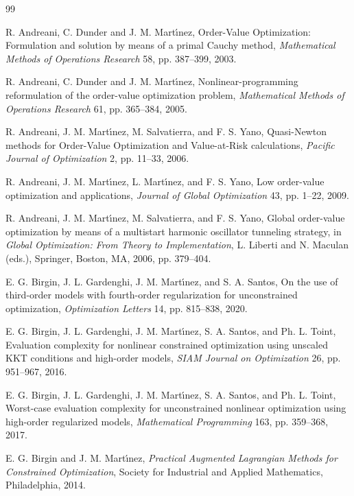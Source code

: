 \documentclass[11pt]{article}
\begin{document}
\begin{thebibliography}{99}

 R. Andreani, C. Dunder and J. M. Mart\'{\i}nez, Order-Value Optimization: Formulation and solution by means of a primal Cauchy method, \textit{Mathematical Methods of Operations Research} 58, pp. 387--399, 2003.

 R. Andreani, C. Dunder and J. M. Mart\'{\i}nez, Nonlinear-programming reformulation of the order-value optimization problem, \textit{Mathematical Methods of Operations Research} 61, pp. 365--384, 2005.

 R. Andreani, J. M. Mart\'{\i}nez, M. Salvatierra, and F. S. Yano, Quasi-Newton methods for Order-Value Optimization and Value-at-Risk calculations, \textit{Pacific Journal of Optimization} 2, pp. 11--33, 2006.

 R. Andreani, J. M. Mart\'{\i}nez, L. Mart\'{\i}nez, and F. S. Yano, Low order-value optimization and applications, \textit{Journal of Global Optimization} 43, pp. 1--22, 2009.

 R. Andreani, J. M. Mart\'{\i}nez, M. Salvatierra, and F. S. Yano, Global order-value optimization by means of a multistart harmonic oscillator tunneling strategy, in \textit{Global Optimization: From Theory to Implementation}, L. Liberti and N. Maculan (eds.), Springer, Boston, MA, 2006, pp. 379--404.

 E. G. Birgin, J. L. Gardenghi, J. M. Mart\'{\i}nez, and S. A. Santos, On the use of third-order models with fourth-order regularization for unconstrained optimization, \textit{Optimization Letters} 14, pp. 815--838, 2020.

 E. G. Birgin, J. L. Gardenghi, J. M. Mart\'{\i}nez, S. A. Santos, and Ph. L. Toint, Evaluation complexity for nonlinear constrained optimization using unscaled KKT conditions and high-order models, \textit{SIAM Journal on Optimization} 26, pp. 951--967, 2016.

 E. G. Birgin, J. L. Gardenghi, J. M. Mart\'{\i}nez, S. A. Santos, and Ph. L. Toint, Worst-case evaluation complexity for unconstrained nonlinear optimization using high-order regularized models, \textit{Mathematical Programming} 163, pp. 359--368, 2017.

 E. G. Birgin and J. M. Mart\'{\i}nez, \textit{Practical Augmented Lagrangian Methods for Constrained Optimization}, Society for Industrial and Applied Mathematics, Philadelphia, 2014.


\end{thebibliography}
\end{document}
